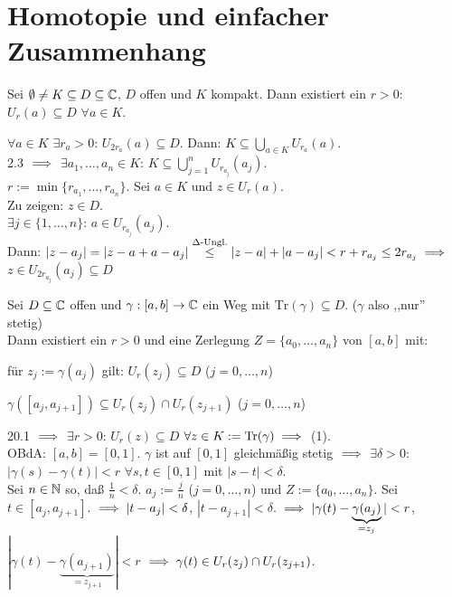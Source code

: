 \documentclass[a4paper,twoside,DIV15,BCOR12mm]{scrbook}
\def\Tr{\text{Tr}}
\def\abnC{\ensuremath{[a,b]\to\MdC}}
\begin{document}
\chapter{Homotopie und einfacher Zusammenhang} 
\begin{lemma}
  Sei $\emptyset \ne K \subseteq D\subseteq\mathbb{C}$, $D$ offen und $K$ kompakt. Dann existiert ein $r>0$: $U_r(a)\subseteq D$ $\forall a\in K$.
\end{lemma}
\begin{beweis}
  $\forall a\in K$ $\exists r_a>0$: $U_{2r_a}(a) \subseteq D$. Dann: $K \subseteq \bigcup\limits_{a\in K} U_{r_a}(a)$. \\
  2.3 $\implies$ $\exists a_1, \dots, a_n \in K$: $K\subseteq \bigcup\limits_{j=1}^n U_{r_{a_j}}(a_j)$.\\
  $r:= \min\{r_{a_1},\dots,r_{a_n}\}$. Sei $a\in K$ und $z\in U_r(a)$. \\
  Zu zeigen: $z\in D$.\\$\exists j\in\{1,\dots,n\}$: $a\in U_{r_{a_j}}(a_j)$. \\
  Dann: $|z-a_j| = |z-a+a-a_j| \stackrel{\Delta\text{-Ungl.}}{\le} |z-a|+|a-a_j| < r+r_{a_j} \le 2r_{a_j} \implies$ $z\in U_{2r_{a_j}}(a_j) \subseteq D$
\end{beweis}
\begin{lemma}
  Sei $D\subseteq \mathbb{C}$ offen und $\gamma: \abnC$ ein Weg mit $\Tr(\gamma) \subseteq D$. ($\gamma$ also ,,nur'' stetig)\\
  Dann existiert ein $r>0$ und eine Zerlegung $Z=\{a_0,\dots,a_n\}$ von $[a,b]$ mit:
  \begin{liste}
    \item f\"ur $z_j:=\gamma(a_j)$ gilt: $U_r(z_j)\subseteq D$ ($j=0,\dots,n$)
    \item $\gamma([a_j,a_{j+1}])\subseteq U_r(z_j)\cap U_r(z_{j+1})$ ($j=0,\dots,n$)
  \end{liste}
\end{lemma}
\begin{beweis}
  20.1 $\implies$ $\exists r>0$: $U_r(z) \subseteq D$ $\forall z\in K:=\Tr(\gamma)\folgt$ (1).\\
  OBdA: $[a,b] = [0,1]$. $\gamma$ ist auf $[0,1]$ gleichm\"a{\ss}ig stetig $\implies$ $\exists \delta>0$: $|\gamma(s)-\gamma(t)|<r$ $\forall s,t\in [0,1]$ mit $|s-t|<\delta$.\\
  Sei $n\in\mathbb{N}$ so, da{\ss} $\frac1{n}<\delta$. $a_j:=\frac{j}{n}$ ($j=0,\dots,n$) und $Z:=\{a_0,\dots,a_n\}$. 
  Sei $t\in [a_j,a_{j+1}]$. $\implies |t-a_j|<\delta$, $|t-a_{j+1}|<\delta$. $\implies |\gamma(t)-\underbrace{\gamma(a_j)}_{=z_j}|<r$, $|\gamma(t)-\underbrace{\gamma(a_{j+1})}_{=z_{j+1}}|<r$ 
  $\implies \gamma(t)\in U_r(z_j) \cap U_r(z_{j+1})$.
\end{beweis}
\end{document}
